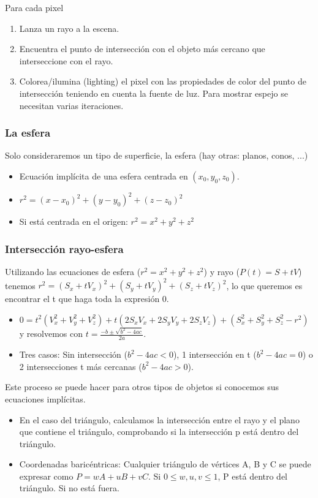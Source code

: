 Para cada pixel
\begin{enumerate}
    \item Lanza un rayo a la escena.
    \item Encuentra el punto de intersección con el objeto más cercano que interseccione con el rayo.
    \item Colorea/ilumina (lighting) el pixel con las propiedades de color del punto de intersección teniendo en cuenta la fuente de luz. Para mostrar espejo se necesitan varias iteraciones.
\end{enumerate}

\subsubsection{La esfera} 
Solo consideraremos un tipo de superficie, la esfera (hay otras: planos, conos, ...)
\begin{itemize}
    \item Ecuación implícita de una esfera centrada en $(x_0, y_0, z_0)$.
    \item $r^2=(x-x_0)^2+(y-y_0)^2+(z-z_0)^2$
    \item Si está centrada en el origen: $r^2=x^2+y^2+z^2$
\end{itemize}

\subsubsection{Intersección rayo-esfera} 
Utilizando las ecuaciones de esfera ($r^2=x^2+y^2+z^2$) y rayo ($P(t)=S+tV$) tenemos $r^2=(S_x+tV_x)^2+(S_y+tV_y)^2+(S_z+tV_z)^2$, lo que queremos es encontrar el t que haga toda la expresión 0.
\begin{itemize}
    \item $0=t^2(V_x^2+V_y^2+V_z^2)+t(2S_xV_x+2S_yV_y+2S_zV_z)+(S_x^2+S_y^2+S_z^2-r^2)$ y resolvemos con $t=\frac{-b \pm \sqrt{b^2-4ac}}{2a}$.
    \item Tres casos: Sin intersección ($b^2-4ac <0$), 1 intersección en t ($b^2-4ac =0$) o 2 intersecciones t más cercanas ($b^2-4ac >0$).
\end{itemize}

Este proceso se puede hacer para otros tipos de objetos si conocemos sus ecuaciones implícitas.
\begin{itemize}
    \item En el caso del triángulo, calculamos la intersección entre el rayo y el plano que contiene el triángulo, comprobando si la intersección p está dentro del triángulo.
    \item Coordenadas baricéntricas: Cualquier triángulo de vértices A, B y C se puede expresar como $P=wA+uB+vC$. Si $0\leq w, u, v \leq 1$, P está dentro del triángulo. Si no está fuera.
\end{itemize}


